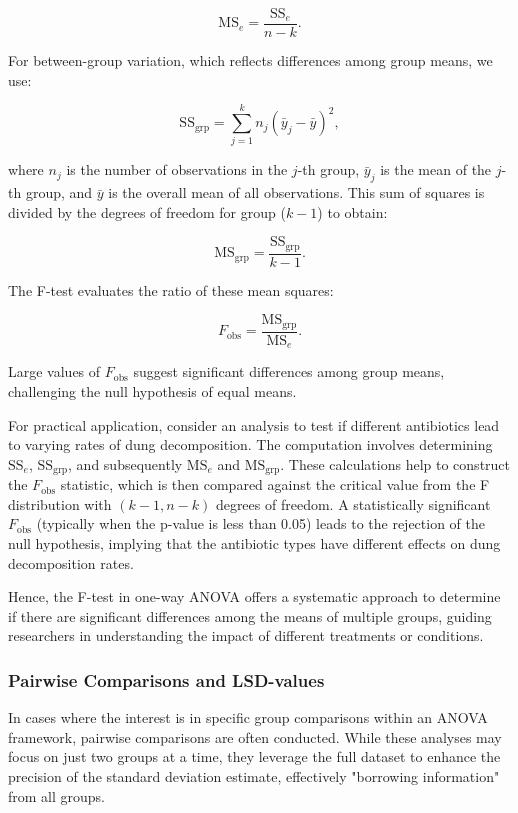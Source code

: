 \documentclass{article}
\begin{document}
\[
\text{MS}_{e} = \frac{\text{SS}_{e}}{n - k}.
\]

For between-group variation, which reflects differences among group means, we use:

\[
\text{SS}_{\text{grp}} = \sum_{j=1}^{k} n_j (\bar{y}_j - \bar{y})^2,
\]

where $n_j$ is the number of observations in the $j$-th group, $\bar{y}_j$ is the mean of the $j$-th group, and $\bar{y}$ is the overall mean of all observations. This sum of squares is divided by the degrees of freedom for group ($k - 1$) to obtain:

\[
\text{MS}_{\text{grp}} = \frac{\text{SS}_{\text{grp}}}{k - 1}.
\]

The F-test evaluates the ratio of these mean squares:

\[
F_{\text{obs}} = \frac{\text{MS}_{\text{grp}}}{\text{MS}_{e}}.
\]

Large values of $F_{\text{obs}}$ suggest significant differences among group means, challenging the null hypothesis of equal means.

For practical application, consider an analysis to test if different antibiotics lead to varying rates of dung decomposition. The computation involves determining $\text{SS}_{e}$, $\text{SS}_{\text{grp}}$, and subsequently $\text{MS}_{e}$ and $\text{MS}_{\text{grp}}$. These calculations help to construct the $F_{\text{obs}}$ statistic, which is then compared against the critical value from the F distribution with $(k - 1, n - k)$ degrees of freedom. A statistically significant $F_{\text{obs}}$ (typically when the p-value is less than 0.05) leads to the rejection of the null hypothesis, implying that the antibiotic types have different effects on dung decomposition rates.

Hence, the F-test in one-way ANOVA offers a systematic approach to determine if there are significant differences among the means of multiple groups, guiding researchers in understanding the impact of different treatments or conditions.

\subsubsection{Pairwise Comparisons and LSD-values}

In cases where the interest is in specific group comparisons within an ANOVA framework, pairwise comparisons are often conducted. While these analyses may focus on just two groups at a time, they leverage the full dataset to enhance the precision of the standard deviation estimate, effectively "borrowing information" from all groups.
\end{document}
